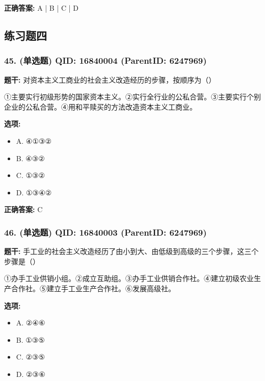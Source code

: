 \documentclass[12pt,UTF8]{ctexart}
\begin{document}
\textbf{正确答案:}
A | B | C | D

\vspace{0.3em}\hrulefill\vspace{0.7em}

\subsection*{练习题四}

\subsubsection*{45. (单选题) \small QID: 16840004 (ParentID: 6247969)}

\textbf{题干:}
对资本主义工商业的社会主义改造经历的步骤，按顺序为（）
\par
①主要实行初级形势的国家资本主义。②实行全行业的公私合营。③主要实行个别企业的公私合营。④用和平赎买的方法改造资本主义工商业。



\textbf{选项:}
\begin{itemize}[leftmargin=*]

  \item A. ④①③②

  \item B. ④③②

  \item C. ①③②

  \item D. ①③④②

\end{itemize}

\textbf{正确答案:}
C

\vspace{0.3em}\hrulefill\vspace{0.7em}

\subsubsection*{46. (单选题) \small QID: 16840003 (ParentID: 6247969)}

\textbf{题干:}
手工业的社会主义改造经历了由小到大、由低级到高级的三个步骤，这三个步骤是（）
\par
①办手工业供销小组。②成立互助组。③办手工业供销合作社。④建立初级农业生产合作社。⑤建立手工业生产合作社。⑥发展高级社。



\textbf{选项:}
\begin{itemize}[leftmargin=*]

  \item A. ②④⑥

  \item B. ①③⑤

  \item C. ②③⑤

  \item D. ②③⑥

\end{itemize}
\end{document}
